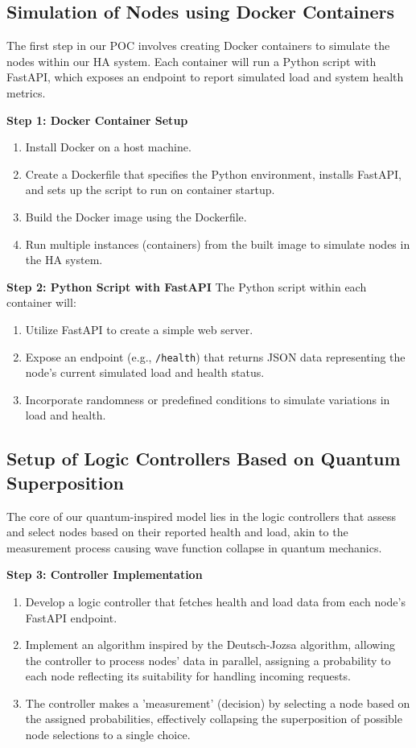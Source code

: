 \documentclass[12pt]{article}
\begin{document}
\subsection{Simulation of Nodes using Docker Containers}
The first step in our POC involves creating Docker containers to simulate the nodes within our HA system. Each container will run a Python script with FastAPI, which exposes an endpoint to report simulated load and system health metrics.

\textbf{Step 1: Docker Container Setup}
\begin{enumerate}
    \item Install Docker on a host machine.
    \item Create a Dockerfile that specifies the Python environment, installs FastAPI, and sets up the script to run on container startup.
    \item Build the Docker image using the Dockerfile.
    \item Run multiple instances (containers) from the built image to simulate nodes in the HA system.
\end{enumerate}

\textbf{Step 2: Python Script with FastAPI}
The Python script within each container will:
\begin{enumerate}
    \item Utilize FastAPI to create a simple web server.
    \item Expose an endpoint (e.g., \texttt{/health}) that returns JSON data representing the node's current simulated load and health status.
    \item Incorporate randomness or predefined conditions to simulate variations in load and health.
\end{enumerate}

\subsection{Setup of Logic Controllers Based on Quantum Superposition}
The core of our quantum-inspired model lies in the logic controllers that assess and select nodes based on their reported health and load, akin to the measurement process causing wave function collapse in quantum mechanics.

\textbf{Step 3: Controller Implementation}
\begin{enumerate}
    \item Develop a logic controller that fetches health and load data from each node's FastAPI endpoint.
    \item Implement an algorithm inspired by the Deutsch-Jozsa algorithm, allowing the controller to process nodes' data in parallel, assigning a probability to each node reflecting its suitability for handling incoming requests.
    \item The controller makes a 'measurement' (decision) by selecting a node based on the assigned probabilities, effectively collapsing the superposition of possible node selections to a single choice.
\end{enumerate}
\end{document}
